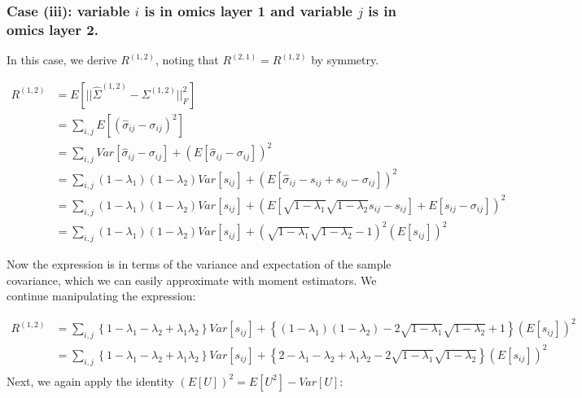 \documentclass[
]{article}
\begin{document}
\hypertarget{case-iii-variable-i-is-in-omics-layer-1-and-variable-j-is-in-omics-layer-2.}{%
\subsubsection{\texorpdfstring{Case (iii): variable \(i\) is in omics
layer 1 and variable \(j\) is in omics layer
2.}{Case (iii): variable i is in omics layer 1 and variable j is in omics layer 2.}}\label{case-iii-variable-i-is-in-omics-layer-1-and-variable-j-is-in-omics-layer-2.}}

In this case, we derive \(R^{(1,2)}\), noting that
\(R^{(2,1)} = R^{(1,2)}\) by symmetry.

\[
\begin{aligned}
R^{(1,2)} &= E\left[||\hat\Sigma^{(1,2)} - \Sigma^{(1,2)}||^2_F\right] \\
&= \sum_{i,j}E\left[(\hat\sigma_{ij}-\sigma_{ij})^2\right] \\
&= \sum_{i,j} Var[\hat\sigma_{ij}-\sigma_{ij}] + (E[\hat\sigma_{ij}-\sigma_{ij}])^2 \\
&= \sum_{i,j} (1-\lambda_1)(1-\lambda_2)Var[s_{ij}] + (E[\hat\sigma_{ij}-s_{ij}+s_{ij}-\sigma_{ij}])^2\\
&= \sum_{i,j} (1-\lambda_1)(1-\lambda_2)Var[s_{ij}] + (E[\sqrt{1-\lambda_1}\sqrt{1-\lambda_2}s_{ij}-s_{ij}] + E[s_{ij}-\sigma_{ij}])^2 \\
&= \sum_{i,j} (1-\lambda_1)(1-\lambda_2)Var[s_{ij}] + (\sqrt{1-\lambda_1}\sqrt{1-\lambda_2}-1)^2(E[s_{ij}])^2
\end{aligned}
\]

Now the expression is in terms of the variance and expectation of the
sample covariance, which we can easily approximate with moment
estimators. We continue manipulating the expression:

\[
\begin{aligned}
R^{(1,2)} &= \sum_{i,j} \left\{1-\lambda_1-\lambda_2+\lambda_1\lambda_2\right\}Var[s_{ij}] + \left\{(1-\lambda_1)(1-\lambda_2) - 2\sqrt{1-\lambda_1}\sqrt{1-\lambda_2} + 1\right\}(E[s_{ij}])^2 \\
&= \sum_{i,j} \left\{1-\lambda_1-\lambda_2+\lambda_1\lambda_2\right\}Var[s_{ij}] + \left\{2 -\lambda_1 -\lambda_2 + \lambda_1\lambda_2 - 2\sqrt{1-\lambda_1}\sqrt{1-\lambda_2}\right\}(E[s_{ij}])^2  \\
\end{aligned}
\] Next, we again apply the identity \((E[U])^2=E[U^2]-Var[U]\):
\end{document}
